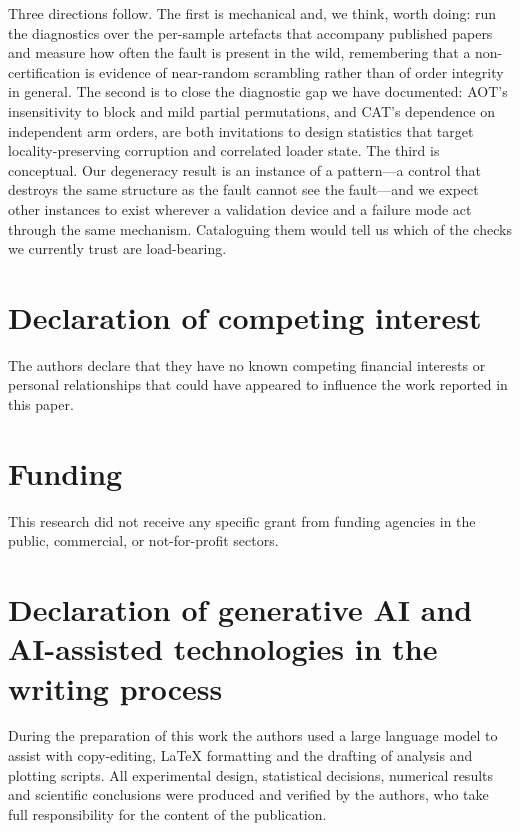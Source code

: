 \documentclass[a4paper,fleqn]{cas-sc}
\begin{document}
Three directions follow. The first is mechanical and, we think, worth doing: run
the diagnostics over the per-sample artefacts that accompany published papers and
measure how often the fault is present in the wild, remembering that a
non-certification is evidence of near-random scrambling rather than of order
integrity in general. The second is to close the diagnostic gap we have documented:
AOT's insensitivity to block and mild partial permutations, and CAT's dependence on
independent arm orders, are both invitations to design statistics that target
locality-preserving corruption and correlated loader state. The third is
conceptual. Our degeneracy result is an instance of a pattern---a control that
destroys the same structure as the fault cannot see the fault---and we expect other
instances to exist wherever a validation device and a failure mode act through the
same mechanism. Cataloguing them would tell us which of the checks we currently
trust are load-bearing.

\printcredits

\section*{Declaration of competing interest}
The authors declare that they have no known competing financial interests or
personal relationships that could have appeared to influence the work reported in
this paper.

\section*{Funding}
This research did not receive any specific grant from funding agencies in the
public, commercial, or not-for-profit sectors.

\section*{Declaration of generative AI and AI-assisted technologies in the
writing process}
During the preparation of this work the authors used a large language model to
assist with copy-editing, LaTeX formatting and the drafting of analysis and
plotting scripts. All experimental design, statistical decisions, numerical
results and scientific conclusions were produced and verified by the authors, who
take full responsibility for the content of the publication.
\end{document}
